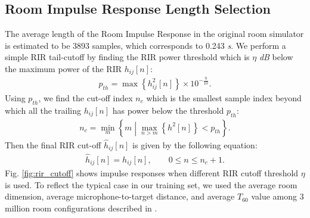 \documentclass{article}
\begin{document}
\subsection{Room Impulse Response Length Selection}
%
%
The average length of the Room Impulse Response in the original room
simulator is estimated to be 3893 samples, which corresponds to 0.243
\textit{s}.
%
We perform a simple RIR tail-cutoff by finding the RIR power threshold
which is $\eta$ \textit{dB} below the maximum power of the RIR
$h_{ij}[n]$:
\begin{align}
  p_{th} = \max \left \{h_{ij}^2[n] \right \} \times 10^{-\frac{\eta}{10}}.
\end{align}
Using $p_{th}$, we find the cut-off index $n_c$ which is the smallest
sample index beyond which all the trailing $h_{ij}[n]$ has power
below the threshold $p_{th}$:
\begin{align}
  n_c = \min_{m} \left\{
  m \middle| \max_{n > m} \left\{  h^2[n] \right \} <  p_{th}  \right \}.
\end{align}
Then the final RIR cut-off $\widehat{h}_{ij}[n]$ is given
by the following equation:
\begin{align}
  \widehat{h}_{ij}[n] = h_{ij}[n], \qquad 0 \le n \le n_c + 1.
\end{align}
Fig. \ref{fig:rir_cutoff} shows impulse responses when different RIR
cutoff threshold $\eta$ is used. To reflect the typical case in
our training set, we used the average room dimension, average
microphone-to-target distance, and average $T_{60}$ value among
3 million room configurations described in \cite{C_Kim_INTERSPEECH_2017_1}.
\end{document}
